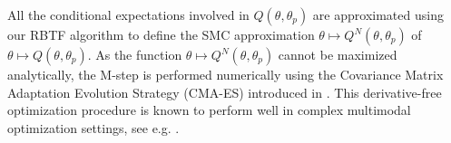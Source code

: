 All the conditional expectations involved in $Q(\theta,\theta_p)$ are approximated using our RBTF algorithm to define the SMC approximation  $\theta\mapsto Q^N(\theta,\theta_p)$ of $\theta\mapsto Q(\theta,\theta_p)$.
As the function $\theta\mapsto Q^N(\theta,\theta_p)$ cannot be maximized analytically, the M-step is performed numerically using the Covariance Matrix Adaptation Evolution Strategy (CMA-ES) introduced in \cite{hansen:ostermeier:2001}. This derivative-free optimization procedure is known to perform well in complex multimodal optimization settings, see e.g. \cite{hansen:kern:2004}.




